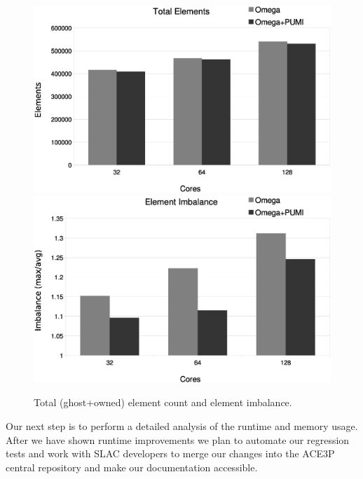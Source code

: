 \documentclass[a4paper]{article}
\begin{document}
\begin{figure}[ht]
\centering
  \includegraphics[width=\textwidth]{total-elms.eps} \\
  \includegraphics[width=\textwidth]{elm-imb.eps} \\
  \caption{\label{fig:elm} Total (ghost+owned) element count and element imbalance.}
\end{figure}

Our next step is to perform a detailed analysis of the runtime and memory
usage.
After we have shown runtime improvements we plan to automate our regression
tests and work with SLAC developers to merge our changes into
the ACE3P central repository and make our documentation accessible.

\newpage 

\end{document}

